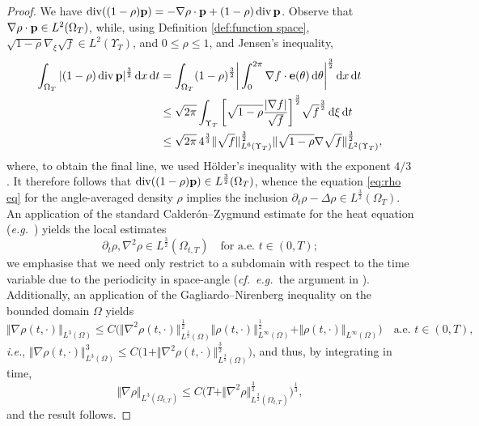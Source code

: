 \documentclass[11pt,a4paper,reqno]{amsart}
\theoremstyle{remark}
\theoremstyle{definition}
\numberwithin{equation}{section}
\DeclareMathOperator{\dv}{div}
\newcommand{\p}{{\bf p}}
\newcommand{\e}{{\bf e}}
\newcommand{\bxi}{\xi}
\renewcommand{\d}{\, \mathrm{d} }
\begin{document}
\begin{proof}
We have $\dv((1-\rho)\p) = -{\nabla \rho \cdot \p} + (1-\rho) \dv \p$. Observe that $\nabla \rho \cdot \p \in L^2(\Omega_T)$, while, using  Definition \ref{def:function space}, $\sqrt{1-\rho}\nabla_{\bxi}\sqrt{f} \in L^2(\Upsilon_T)$, and $0 \leq \rho \leq 1$, and Jensen's inequality, 
\begin{equation*}
   \begin{aligned} \int_{\Omega_T} |(1-\rho) \dv \p |^{\frac{3}{2}} \d x \d t &= \int_{\Omega_T} (1-\rho)^{\frac{3}{2}} \bigg| \int_0^{2\pi} \nabla f \cdot \e(\theta) \d \theta \bigg|^{\frac{3}{2}} \d x \d t \\ 
   &\leq \sqrt{2\pi}\int_{\Upsilon_T} \bigg[\sqrt{1-\rho} \frac{|\nabla f |}{\sqrt{f}}\bigg]^{\frac{3}{2}} \sqrt{f}^{\frac{3}{2}} \d \bxi \d t \\ 
   &\leq \sqrt{2\pi} \, 4^{\frac{3}{4}} \Vert \sqrt{f} \Vert_{L^{6}(\Upsilon_T)}^{\frac{3}{2}} \Vert \sqrt{1-\rho}\nabla \sqrt{f} \Vert_{L^2(\Upsilon_T)}^{\frac{3}{2}}, 
   \end{aligned}
\end{equation*}
where, to obtain the final line, we used H\"older's inequality with the exponent $4/3$. It therefore follows that  $\dv((1-\rho)\p) \in L^{\frac{3}{2}}(\Omega_T)$, whence the equation \eqref{eq:rho eq} for the angle-averaged density $\rho$ implies the inclusion $\partial_t \rho - \Delta \rho \in L^{\frac{3}{2}}(\Omega_T)$. An application of the standard Calder\'on--Zygmund estimate for the heat equation (\textit{e.g.}~\cite[Theorem 3.1]{RosHeat}) yields the local estimates 
\begin{equation*}
    \partial_t \rho , \nabla^2 \rho \in L^{\frac{3}{2}}(\Omega_{t,T}) \quad \text{for a.e.~}t\in(0,T); 
\end{equation*}
we emphasise that we need only restrict to a subdomain with respect to the time variable due to the periodicity in space-angle (\textit{cf.}~\textit{e.g.}~the argument in \cite[\S 3.1.3]{reg1}). Additionally, an application of the Gagliardo--Nirenberg inequality on the bounded domain $\Omega$ yields 
\begin{equation*}
    \Vert \nabla \rho(t,\cdot) \Vert_{L^{3}(\Omega)} \leq C \Big(\Vert \nabla^2 \rho(t,\cdot) \Vert_{L^{\frac{3}{2}}(\Omega)}^{\frac{1}{2}} \Vert \rho(t,\cdot) \Vert_{L^{\infty}(\Omega)}^{\frac{1}{2}} + \Vert \rho(t,\cdot) \Vert_{L^{\infty}(\Omega)} \Big) \quad \text{a.e.~}t \in (0,T), 
\end{equation*}
\textit{i.e.}, $\Vert \nabla \rho(t,\cdot) \Vert_{L^{3}(\Omega)}^{3} \leq C \big(1+\Vert \nabla^2 \rho(t,\cdot) \Vert_{L^{\frac{3}{2}}(\Omega)}^{\frac{3}{2}} \big)$, and thus, by integrating in time, 
\begin{equation*}
    \Vert \nabla \rho \Vert_{L^{3}(\Omega_{t,T})} \leq C \big( T +\Vert \nabla^2 \rho \Vert_{L^{\frac{3}{2}}(\Omega_{t,T})}^{\frac{3}{2}} \big)^{\frac{1}{3}}, 
\end{equation*}
and the result follows. 
\end{proof}
\end{document}
